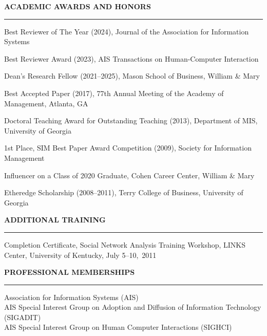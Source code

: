 \documentclass[11pt, letterpaper]{article}
\newcommand{\cvsection}[1]{%
  \vspace{14pt}%
  {\large\bfseries\color{headcolor}\MakeUppercase{#1}}%
  \vspace{2pt}\hrule\vspace{6pt}%
}
\begin{document}
\cvsection{Academic Awards and Honors}

\begin{cvlist}
  \item Best Reviewer of The Year (2024), Journal of the Association for Information Systems
  \item Best Reviewer Award (2023), AIS Transactions on Human-Computer Interaction
  \item Dean's Research Fellow (2021--2025), Mason School of Business, William \& Mary
  \item Best Accepted Paper (2017), 77th Annual Meeting of the Academy of Management, Atlanta, GA
  \item Doctoral Teaching Award for Outstanding Teaching (2013), Department of MIS, University of Georgia
  \item 1st Place, SIM Best Paper Award Competition (2009), Society for Information Management
  \item Influencer on a Class of 2020 Graduate, Cohen Career Center, William \& Mary
  \item Etheredge Scholarship (2008--2011), Terry College of Business, University of Georgia
\end{cvlist}

\cvsection{Additional Training}

Completion Certificate, Social Network Analysis Training Workshop, LINKS Center, University of Kentucky, July 5--10,~2011

\cvsection{Professional Memberships}

Association for Information Systems (AIS)\\
AIS Special Interest Group on Adoption and Diffusion of Information Technology (SIGADIT)\\
AIS Special Interest Group on Human Computer Interactions (SIGHCI)
\end{document}
